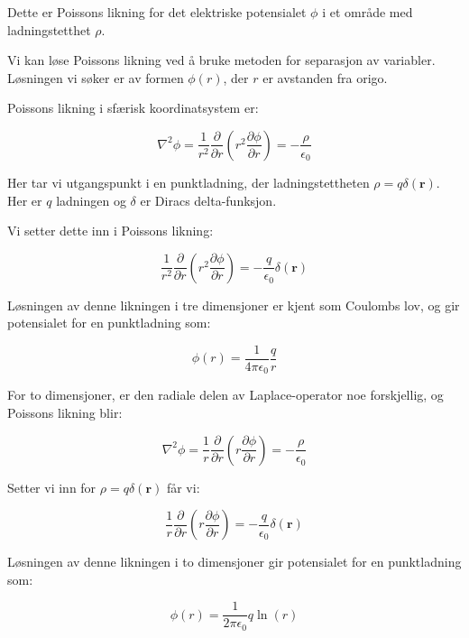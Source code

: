 Dette er Poissons likning for det elektriske potensialet $\phi$ i et område med ladningstetthet $\rho$.


Vi kan løse Poissons likning ved å bruke metoden for separasjon av variabler. Løsningen vi søker er av formen $\phi(r)$, der $r$ er avstanden fra origo.

Poissons likning i sfærisk koordinatsystem er:

\begin{equation*}
\nabla^2 \phi = \frac{1}{r^2} \frac{\partial}{\partial r} \left(r^2 \frac{\partial \phi}{\partial r}\right) = - \frac{\rho}{\epsilon_0}
\end{equation*}

Her tar vi utgangspunkt i en punktladning, der ladningstettheten $\rho = q \delta(\mathbf{r})$. Her er $q$ ladningen og $\delta$ er Diracs delta-funksjon.

Vi setter dette inn i Poissons likning:

\begin{equation*}
\frac{1}{r^2} \frac{\partial}{\partial r} \left(r^2 \frac{\partial \phi}{\partial r}\right) = - \frac{q}{\epsilon_0} \delta(\mathbf{r})
\end{equation*}

Løsningen av denne likningen i tre dimensjoner er kjent som Coulombs lov, og gir potensialet for en punktladning som:

\begin{equation*}
\phi(r) = \frac{1}{4\pi\epsilon_0} \frac{q}{r}
\end{equation*}

For to dimensjoner, er den radiale delen av Laplace-operator noe forskjellig, og Poissons likning blir:

\begin{equation*}
\nabla^2 \phi = \frac{1}{r} \frac{\partial}{\partial r} \left(r \frac{\partial \phi}{\partial r}\right) = - \frac{\rho}{\epsilon_0}
\end{equation*}

Setter vi inn for $\rho = q \delta(\mathbf{r})$ får vi:

\begin{equation*}
\frac{1}{r} \frac{\partial}{\partial r} \left(r \frac{\partial \phi}{\partial r}\right) = - \frac{q}{\epsilon_0} \delta(\mathbf{r})
\end{equation*}

Løsningen av denne likningen i to dimensjoner gir potensialet for en punktladning som:

\begin{equation*}
\phi(r) = \frac{1}{2\pi\epsilon_0} q \ln(r)
\end{equation*}

